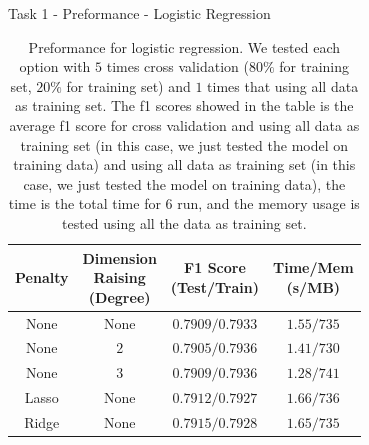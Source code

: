 \documentclass{beamer}
\begin{document}
\begin{frame}{Task 1 - Preformance - Logistic Regression}

  \begin{table}[H]
    \centering
    \begin{tabular}{|c|c|c|c|}
      \hline
      Penalty & \makecell{Dimension                                \\ Raising \\ (Degree)} & \makecell{F1 Score \\ (Test/Train)} & \makecell{Time/Mem \\ (s/MB)} \\
      \hline
      None    & None                & $0.7909/0.7933$ & $1.55/735$ \\
      \hline
      None    & $2$                 & $0.7905/0.7936$ & $1.41/730$ \\
      \hline
      None    & $3$                 & $0.7909/0.7936$ & $1.28/741$ \\
      \hline
      Lasso   & None                & $0.7912/0.7927$ & $1.66/736$ \\
      \hline
      Ridge   & None                & $0.7915/0.7928$ & $1.65/735$ \\
      \hline
    \end{tabular}
    \caption{Preformance for logistic regression. We tested each option with $5$ times cross validation ($80\%$ for training set, $20\%$ for training set) and $1$ times that using all data as training set. The f1 scores showed in the table is the average f1 score for cross validation and using all data as training set (in this case, we just tested the model on training data) and using all data as training set (in this case, we just tested the model on training data), the time is the total time for $6$ run, and the memory usage is tested using all the data as training set.}
  \end{table}

\end{frame}
\end{document}
